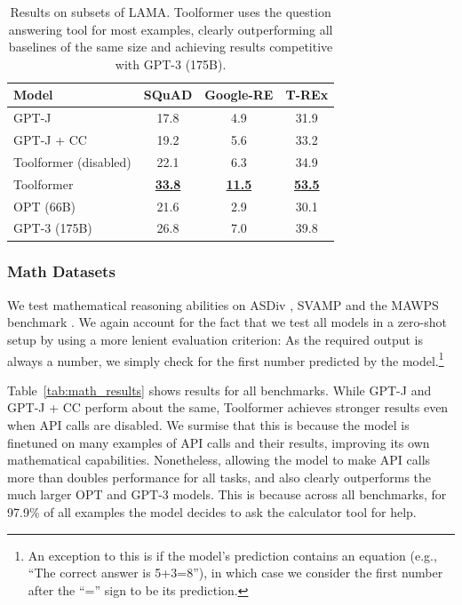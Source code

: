 \documentclass[11pt]{article}
\newcommand{\ours}[0]{Toolformer}
\begin{document}
\begin{CJK*}{UTF8}{gbsn}
\begin{table}
    \centering
    \small
    \setlength{\tabcolsep}{3pt}
    \begin{tabularx}{\linewidth}{Xccc}
        \toprule
        \textbf{Model} & \textbf{SQuAD} & \textbf{Google-RE} & \textbf{T-REx} \\
        \midrule
         GPT-J & 17.8 & \phantom{0}4.9 & 31.9 \\         
         GPT-J + CC & 19.2 & \phantom{0}5.6 & 33.2 \\        
         \ours{} (disabled) & 22.1 & \phantom{0}6.3 & 34.9  \\
        \ours{} & \underline{\textbf{33.8}} & \underline{\textbf{11.5}} & \underline{\textbf{53.5}} \\
         \midrule
         OPT (66B) & 21.6 & \phantom{0}2.9 & 30.1 \\
         GPT-3 (175B) & 26.8 & \phantom{0}7.0 & 39.8 \\
         \bottomrule
    \end{tabularx}
    \caption{Results on subsets of LAMA. \ours{} uses the question answering tool for most examples, clearly outperforming all baselines of the same size and achieving results competitive with GPT-3 (175B).}
    \label{tab:lama_results}
\end{table}

\subsubsection{Math Datasets}

We test mathematical reasoning abilities on ASDiv \citep{miao-etal-2020-diverse}, SVAMP \citep{patel-etal-2021-nlp} and the MAWPS benchmark \citep{koncel-kedziorski-etal-2016-mawps}. We again account for the fact that we test all models in a zero-shot setup by using a more lenient evaluation criterion: As the required output is always a number, we simply check for the first number predicted by the model.\footnote {An exception to this is if the model's prediction contains an equation (e.g., ``The correct answer is 5+3=8''), in which case we consider the first number after the ``='' sign to be its prediction.}

Table~\ref{tab:math_results} shows results for all benchmarks. While GPT-J and GPT-J + CC perform about the same, \ours{} achieves stronger results even when API calls are disabled. We surmise that this is because the model is finetuned on many examples of API calls and their results, improving its own mathematical capabilities. Nonetheless, allowing the model to make API calls more than doubles performance for all tasks, and also clearly outperforms the much larger OPT and GPT-3 models. This is because across all benchmarks, for 97.9\% of all examples the model decides to ask the calculator tool for help.


\end{CJK*}
\end{document}
